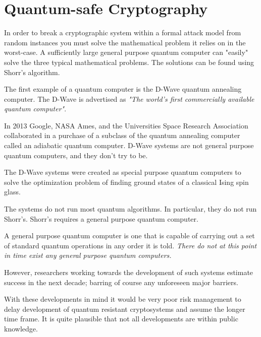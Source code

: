 \section{Quantum-safe Cryptography}

In order to break a cryptographic system within a formal attack model from random instances you must solve the mathematical problem it relies on in the worst-case. A sufficiently large general purpose quantum computer can "easily" solve the three typical mathematical problems. The solutions can be found using Shorr’s algorithm.

The first example of a quantum computer is the D-Wave quantum annealing computer. The D-Wave is advertised as 
\textit{"The world's first commercially available quantum computer"}. 
 
In 2013 Google, NASA Ames, and the Universities Space Research Association collaborated in a purchase of a subclass of the quantum annealing computer called an adiabatic quantum computer.  
D-Wave systems are not general purpose quantum computers, and they don't try to be. 
 
The D-Wave systems were created as special purpose quantum computers to solve the optimization problem of finding ground states of a classical Ising spin glass. 
  
The systems do not run most quantum algorithms. In particular, they do not run Shorr’s.
Shorr’s requires a general purpose quantum computer. 
 
A general purpose quantum computer is one that is capable of carrying out a set of standard quantum operations in any order it is told.
\textit{There do not at this point in time exist any general purpose quantum computers.} 

However, researchers working towards the development of such systems estimate success in the next decade; barring of course any unforeseen major barriers.  
 
With these developments in mind it would be very poor risk management to delay development of quantum resistant cryptosystems and assume the longer time frame. It is quite plausible that not all developments are within public knowledge. 

